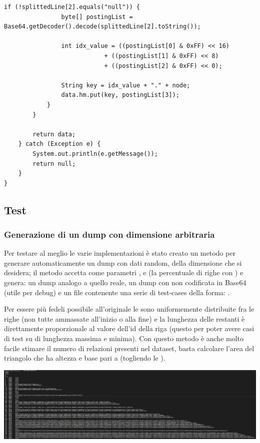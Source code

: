 \begin{lstlisting}[style=JavaStyle, caption=Implentazione con HashMap]
            if (!splittedLine[2].equals("null")) {
                byte[] postingList = Base64.getDecoder().decode(splittedLine[2].toString());

                int idx_value = ((postingList[0] & 0xFF) << 16)
                            + ((postingList[1] & 0xFF) << 8)
                            + ((postingList[2] & 0xFF) << 0);

                String key = idx_value + "." + node;
                data.hm.put(key, postingList[3]);
            }
        }

        return data;
    } catch (Exception e) {
        System.out.println(e.getMessage());
        return null;
    }
}
\end{lstlisting}

\subsection{Test}

\subsubsection{Generazione di un dump con dimensione arbitraria}
Per testare al meglio le varie implementazioni è stato creato un metodo per generare automaticamente un dump con dati random, della dimensione che si desidera;
il metodo  accetta come parametri ,  e  (la percentuale di righe con ) e genera: un dump 
analogo a quello reale, un dump con  non codificata in Base64 (utile per debug) e un file contenente una serie di test-cases della forma: 
.

Per essere più fedeli possibile all'originale le  sono uniformemente distribuite fra le righe (non tutte ammassate all'inizio o alla fine) e la lunghezza delle restanti 
è direttamente proporzionale al valore dell'id della riga (questo per poter avere casi di test su  di lunghezza massima e minima). 
Con questo metodo è anche molto facile stimare il numero di relazioni presenti nel dataset, basta calcolare l'area del triangolo che ha altezza e base pari a  (togliendo 
le ).

\begin{center}
    \includegraphics[scale=0.45]{Sources/Img/c03_01.png}
\end{center}

